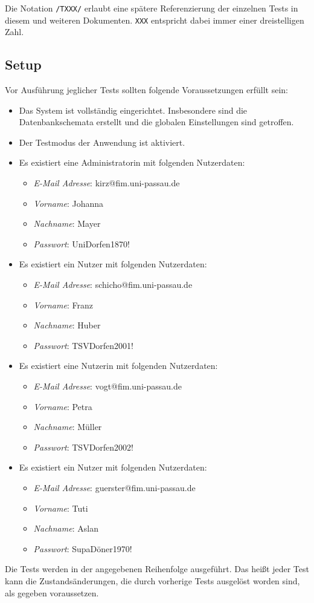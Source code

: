 
Die Notation \texttt{/TXXX/} erlaubt eine spätere Referenzierung der einzelnen Tests in diesem und weiteren
Dokumenten. \texttt{XXX} entspricht dabei immer einer dreistelligen Zahl.
\subsection{Setup}\label{setup}
Vor Ausführung jeglicher Tests sollten folgende Voraussetzungen erfüllt sein:
\begin{itemize}
	\item Das System ist vollständig eingerichtet.
	Insbesondere sind die Datenbankschemata erstellt und die globalen Einstellungen sind getroffen.
	\item Der Testmodus der Anwendung ist aktiviert.
	\item Es existiert eine Administratorin mit folgenden Nutzerdaten:
	\begin{itemize}
		\item \emph{E-Mail Adresse}: kirz@fim.uni-passau.de
		\item \emph{Vorname}: Johanna
		\item \emph{Nachname}: Mayer
		\item \emph{Passwort}: UniDorfen1870!
	\end{itemize}
	\item Es existiert ein Nutzer mit folgenden Nutzerdaten:
	\begin{itemize}
		\item \emph{E-Mail Adresse}: schicho@fim.uni-passau.de
		\item \emph{Vorname}: Franz
		\item \emph{Nachname}: Huber
		\item \emph{Passwort}: TSVDorfen2001!
	\end{itemize}
	\item Es existiert eine Nutzerin mit folgenden Nutzerdaten:
	\begin{itemize}
		\item \emph{E-Mail Adresse}: vogt@fim.uni-passau.de
		\item \emph{Vorname}: Petra
		\item \emph{Nachname}: Müller
		\item \emph{Passwort}: TSVDorfen2002!
	\end{itemize}
	\item Es existiert ein Nutzer mit folgenden Nutzerdaten:
	\begin{itemize}
		\item \emph{E-Mail Adresse}: guerster@fim.uni-passau.de
		\item \emph{Vorname}: Tuti
		\item \emph{Nachname}: Aslan
		\item \emph{Passwort}: SupaDöner1970!
	\end{itemize}
\end{itemize}
Die Tests werden in der angegebenen Reihenfolge ausgeführt.
Das heißt jeder Test kann die Zustandsänderungen, die durch vorherige Tests ausgelöst worden sind, als gegeben voraussetzen.
